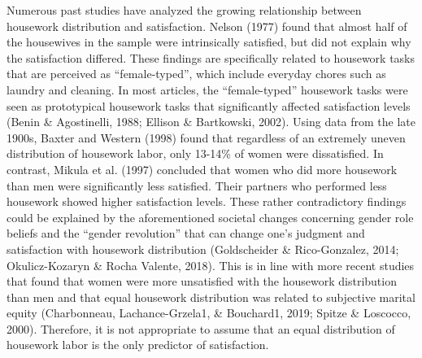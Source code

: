 \documentclass[
  man,floatsintext]{apa6}
\begin{document}
Numerous past studies have analyzed the growing relationship between housework distribution and satisfaction. Nelson (1977) found that almost half of the housewives in the sample were intrinsically satisfied, but did not explain why the satisfaction differed. These findings are specifically related to housework tasks that are perceived as ``female-typed'', which include everyday chores such as laundry and cleaning. In most articles, the ``female-typed'' housework tasks were seen as prototypical housework tasks that significantly affected satisfaction levels (Benin \& Agostinelli, 1988; Ellison \& Bartkowski, 2002). Using data from the late 1900s, Baxter and Western (1998) found that regardless of an extremely uneven distribution of housework labor, only 13-14\% of women were dissatisfied. In contrast, Mikula et al. (1997) concluded that women who did more housework than men were significantly less satisfied. Their partners who performed less housework showed higher satisfaction levels.
These rather contradictory findings could be explained by the aforementioned societal changes concerning gender role beliefs and the ``gender revolution'' that can change one's judgment and satisfaction with housework distribution (Goldscheider \& Rico-Gonzalez, 2014; Okulicz-Kozaryn \& Rocha Valente, 2018). This is in line with more recent studies that found that women were more unsatisfied with the housework distribution than men and that equal housework distribution was related to subjective marital equity (Charbonneau, Lachance-Grzela1, \& Bouchard1, 2019; Spitze \& Loscocco, 2000). Therefore, it is not appropriate to assume that an equal distribution of housework labor is the only predictor of satisfaction.
\end{document}
